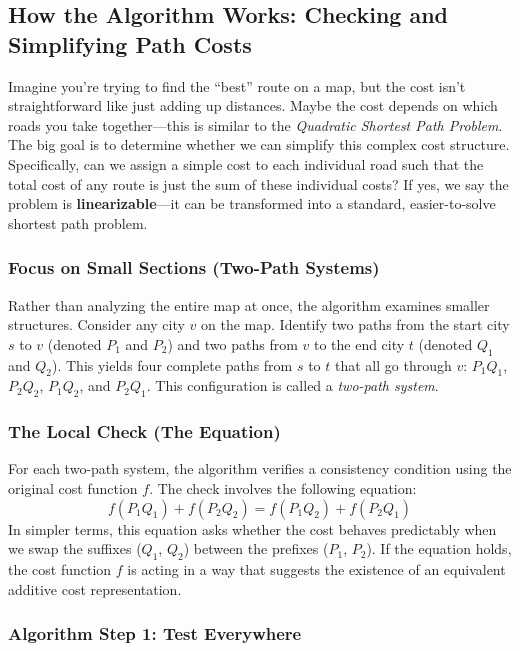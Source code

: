 \documentclass[12pt]{article}
\begin{document}
\subsection*{How the Algorithm Works: Checking and Simplifying Path Costs}

Imagine you're trying to find the ``best'' route on a map, but the cost isn't straightforward like just adding up distances. Maybe the cost depends on which roads you take together---this is similar to the \textit{Quadratic Shortest Path Problem}. The big goal is to determine whether we can simplify this complex cost structure. Specifically, can we assign a simple cost to each individual road such that the total cost of any route is just the sum of these individual costs? If yes, we say the problem is \textbf{linearizable}—it can be transformed into a standard, easier-to-solve shortest path problem.

\subsubsection*{Focus on Small Sections (Two-Path Systems)}

Rather than analyzing the entire map at once, the algorithm examines smaller structures. Consider any city $v$ on the map. Identify two paths from the start city $s$ to $v$ (denoted $P_1$ and $P_2$) and two paths from $v$ to the end city $t$ (denoted $Q_1$ and $Q_2$). This yields four complete paths from $s$ to $t$ that all go through $v$: $P_1Q_1$, $P_2Q_2$, $P_1Q_2$, and $P_2Q_1$. This configuration is called a \textit{two-path system}.

\subsubsection*{The Local Check (The Equation)}

For each two-path system, the algorithm verifies a consistency condition using the original cost function $f$. The check involves the following equation:
\[
f(P_1Q_1) + f(P_2Q_2) = f(P_1Q_2) + f(P_2Q_1)
\]
In simpler terms, this equation asks whether the cost behaves predictably when we swap the suffixes ($Q_1$, $Q_2$) between the prefixes ($P_1$, $P_2$). If the equation holds, the cost function $f$ is acting in a way that suggests the existence of an equivalent additive cost representation.

\subsubsection*{Algorithm Step 1: Test Everywhere}
\end{document}
